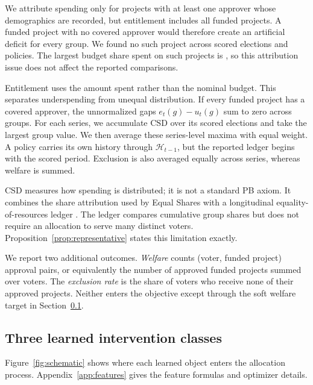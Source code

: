\documentclass{article}
\newcommand{\csd}{\mathrm{CSD}}
\begin{document}
We attribute spending only for projects with at least one approver whose
demographics are recorded, but entitlement includes all funded projects. A
funded project with no covered approver would therefore create an artificial
deficit for every group. We found no such project across
\CoverageScoredEditions{} scored elections and \CoveragePolicyN{} policies.
The largest budget share spent on such projects is
\CoverageMaxUncoveredShare{}, so this attribution issue does not affect the
reported comparisons.

Entitlement uses the amount spent rather than the nominal budget. This separates
underspending from unequal distribution. If every funded project has a
covered approver, the unnormalized gaps $e_t(g)-u_t(g)$ sum to zero across
groups. For each series, we accumulate $\csd$ over its scored elections and take
the largest group value. We then average these series-level maxima with equal
weight. A policy carries its own history through $\mathcal{H}_{t-1}$, but the
reported ledger begins with the scored period. Exclusion is also averaged
equally across series, whereas welfare is summed.

CSD measures how spending is distributed; it is not a standard PB axiom. It combines the
share attribution used by Equal Shares
\citep{peters2020welfarism} with a longitudinal equality-of-resources ledger
\citep{maly2023equality}. The ledger compares cumulative group shares but does
not require an allocation to serve many distinct voters.
Proposition~\ref{prop:representative} states this limitation exactly.

We report two additional outcomes. \emph{Welfare} counts (voter, funded project)
approval pairs, or equivalently the number of approved funded projects summed
over voters. The \emph{exclusion rate} is the share of voters who receive none
of their approved projects. Neither enters the objective except through the
soft welfare target in Section~\ref{sec:method}.

\subsection{Three learned intervention classes}
\label{sec:method}

Figure~\ref{fig:schematic} shows where each learned object enters the allocation
process. Appendix~\ref{app:features} gives the feature formulas and optimizer
details.
\end{document}
